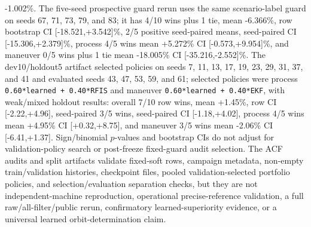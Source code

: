 \begin{table}[t]
-1.002\%. The five-seed prospective guard rerun uses the same scenario-label guard on seeds 67, 71, 73, 79, and 83; it has 4/10 wins plus 1 tie, mean -6.366\%, row bootstrap CI [-18.521,+3.542]\%, 2/5 positive seed-paired means, seed-paired CI [-15.306,+2.379]\%, process 4/5 wins mean +5.272\% CI [-0.573,+9.954]\%, and maneuver 0/5 wins plus 1 tie mean -18.005\% CI [-35.216,-2.552]\%. The dev10/holdout5 artifact selected policies on seeds 7, 11, 13, 17, 19, 23, 29, 31, 37, and 41 and evaluated seeds 43, 47, 53, 59, and 61; selected policies were process \texttt{0.60*learned + 0.40*RFIS} and maneuver \texttt{0.60*learned + 0.40*EKF}, with weak/mixed holdout results: overall 7/10 row wins, mean +1.45\%, row CI [-2.22,+4.96], seed-paired 3/5 wins, seed-paired CI [-1.18,+4.02], process 4/5 wins mean +4.95\% CI [+0.32,+8.75], and maneuver 3/5 wins mean -2.06\% CI [-6.41,+1.37]. Sign/binomial $p$-values and bootstrap CIs do not adjust for validation-policy search or post-freeze fixed-guard audit selection. The ACF audits and split artifacts validate fixed-soft rows, campaign metadata, non-empty train/validation histories, checkpoint files, pooled validation-selected portfolio policies, and selection/evaluation separation checks, but they are not independent-machine reproduction, operational precise-reference validation, a full raw/all-filter/public rerun, confirmatory learned-superiority evidence, or a universal learned orbit-determination claim.
\end{table}
